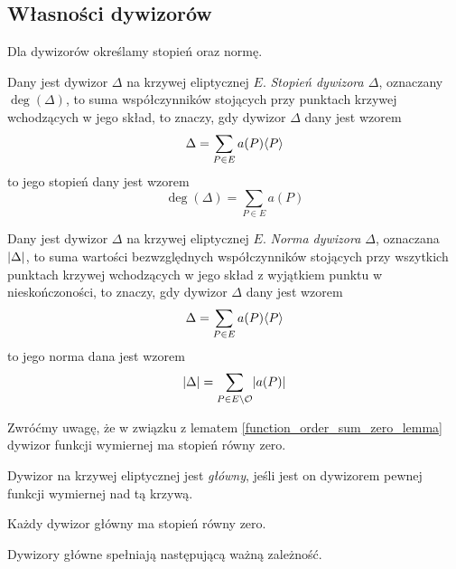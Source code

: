 \subsection*{Własności dywizorów}

Dla dywizorów określamy stopień oraz normę.

\begin{definition}
Dany jest dywizor $\Delta$ na krzywej eliptycznej $E$.
\emph{Stopień dywizora $\Delta$},
oznaczany $\deg(\Delta)$,
to suma współczynników
stojących przy punktach krzywej wchodzących w jego skład,
to znaczy, gdy dywizor $\Delta$ dany jest wzorem
\begin{equation*}
\Delta = \sum_{P \in E} a(P)\langle P\rangle
\end{equation*}
to jego stopień dany jest wzorem
\begin{equation*}
\deg(\Delta) = \sum_{P \in E} a(P)
\end{equation*}
\end{definition}

\begin{definition}
Dany jest dywizor $\Delta$ na krzywej eliptycznej $E$.
\emph{Norma dywizora $\Delta$},
oznaczana $\lvert\Delta\rvert$,
to suma wartości bezwzględnych współczynników
stojących przy wszytkich punktach krzywej wchodzących w jego skład
z wyjątkiem punktu w nieskończoności,
to znaczy, gdy dywizor $\Delta$ dany jest wzorem
\begin{equation*}
\Delta = \sum_{P \in E} a(P)\langle P\rangle
\end{equation*}
to jego norma dana jest wzorem
\begin{equation*}
\lvert\Delta\rvert = \sum_{P \in E \setminus \mathcal{O}} \lvert a(P)\rvert
\end{equation*}
\end{definition}

Zwróćmy uwagę, że w związku z lematem \ref{function_order_sum_zero_lemma}
dywizor funkcji wymiernej ma stopień równy zero.

\begin{definition}
Dywizor na krzywej eliptycznej jest \emph{główny},
jeśli jest on dywizorem pewnej funkcji wymiernej nad tą krzywą.
\end{definition}

\begin{fact}
Każdy dywizor główny ma stopień równy zero.
\end{fact}

Dywizory główne spełniają następującą ważną zależność.

